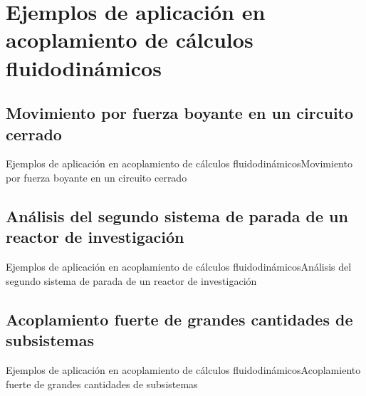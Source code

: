 \section{Ejemplos de aplicación en acoplamiento de cálculos fluidodinámicos}

\subsection{Movimiento por fuerza boyante en un circuito cerrado}

\begin{frame}{Ejemplos de aplicación en acoplamiento de cálculos fluidodinámicos}{Movimiento por fuerza boyante en un circuito cerrado}

\end{frame}


\subsection{Análisis del segundo sistema de parada de un reactor de investigación}

\begin{frame}{Ejemplos de aplicación en acoplamiento de cálculos fluidodinámicos}{Análisis del segundo sistema de parada de un reactor de investigación}

\end{frame}


\subsection{Acoplamiento fuerte de grandes cantidades de subsistemas}

\begin{frame}{Ejemplos de aplicación en acoplamiento de cálculos fluidodinámicos}{Acoplamiento fuerte de grandes cantidades de subsistemas}

\end{frame}